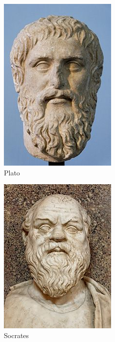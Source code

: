 \begin{minipage}[H]{0.49\linewidth}
  \begin{figure}[H]
  \centering
  \includegraphics[height=0.15\paperheight]{../resources/illustrations/plato2}
  \caption{Plato}
  \end{figure}
\end{minipage}
\begin{minipage}[H]{0.49\linewidth}
  \begin{figure}[H]
  \centering
  \includegraphics[height=0.15\paperheight]{../resources/illustrations/socrates}
  \caption{Socrates}
  \end{figure}
\end{minipage}

